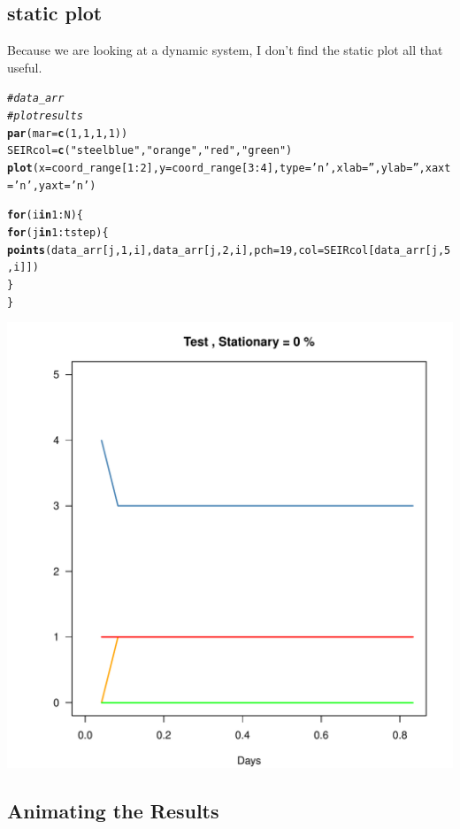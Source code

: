 \documentclass{article}\usepackage[]{graphicx}\usepackage[]{color}
\makeatletter
\def\maxwidth{ %
  \ifdim\Gin@nat@width>\linewidth
    \linewidth
  \else
    \Gin@nat@width
  \fi
}
\newcommand{\hlnum}[1]{\textcolor[rgb]{0.686,0.059,0.569}{#1}}%
\newcommand{\hlstr}[1]{\textcolor[rgb]{0.192,0.494,0.8}{#1}}%
\newcommand{\hlcom}[1]{\textcolor[rgb]{0.678,0.584,0.686}{\textit{#1}}}%
\newcommand{\hlopt}[1]{\textcolor[rgb]{0,0,0}{#1}}%
\newcommand{\hlstd}[1]{\textcolor[rgb]{0.345,0.345,0.345}{#1}}%
\newcommand{\hlkwa}[1]{\textcolor[rgb]{0.161,0.373,0.58}{\textbf{#1}}}%
\newcommand{\hlkwb}[1]{\textcolor[rgb]{0.69,0.353,0.396}{#1}}%
\newcommand{\hlkwc}[1]{\textcolor[rgb]{0.333,0.667,0.333}{#1}}%
\newcommand{\hlkwd}[1]{\textcolor[rgb]{0.737,0.353,0.396}{\textbf{#1}}}%
\newenvironment{kframe}{%
 \def\at@end@of@kframe{}%
 \ifinner\ifhmode%
  \def\at@end@of@kframe{\end{minipage}}%
  \begin{minipage}{\columnwidth}%
 \fi\fi%
 \def\FrameCommand##1{\hskip\@totalleftmargin \hskip-\fboxsep
 \colorbox{shadecolor}{##1}\hskip-\fboxsep
     \hskip-\linewidth \hskip-\@totalleftmargin \hskip\columnwidth}%
 \MakeFramed {\advance\hsize-\width
   \@totalleftmargin\z@ \linewidth\hsize
   \@setminipage}}%
 {\par\unskip\endMakeFramed%
 \at@end@of@kframe}
\newenvironment{knitrout}{}{} %
\makeatother
\begin{document}
\subsection{static plot}

Because we are looking at a dynamic system, I don't find the static plot all that useful. 
\begin{knitrout}
\color{fgcolor}\begin{kframe}
\begin{alltt}
\hlcom{# data_arr}
\hlcom{# plot results}
\hlkwd{par}\hlstd{(}\hlkwc{mar}\hlstd{=}\hlkwd{c}\hlstd{(}\hlnum{1}\hlstd{,}\hlnum{1}\hlstd{,}\hlnum{1}\hlstd{,}\hlnum{1}\hlstd{))}
\hlstd{SEIRcol} \hlkwb{=} \hlkwd{c}\hlstd{(}\hlstr{"steelblue"}\hlstd{,} \hlstr{"orange"}\hlstd{,}\hlstr{"red"}\hlstd{,} \hlstr{"green"}\hlstd{)}
\hlkwd{plot}\hlstd{(}\hlkwc{x}\hlstd{=coord_range[}\hlnum{1}\hlopt{:}\hlnum{2}\hlstd{],} \hlkwc{y}\hlstd{=coord_range[}\hlnum{3}\hlopt{:}\hlnum{4}\hlstd{],} \hlkwc{type}\hlstd{=}\hlstr{'n'}\hlstd{,} \hlkwc{xlab}\hlstd{=}\hlstr{''}\hlstd{,} \hlkwc{ylab}\hlstd{=}\hlstr{''}\hlstd{,} \hlkwc{xaxt}\hlstd{=}\hlstr{'n'}\hlstd{,} \hlkwc{yaxt}\hlstd{=}\hlstr{'n'}\hlstd{)}

\hlkwa{for}\hlstd{(i} \hlkwa{in} \hlnum{1}\hlopt{:}\hlstd{N)\{}
  \hlkwa{for}\hlstd{(j} \hlkwa{in} \hlnum{1}\hlopt{:}\hlstd{tstep)\{}
\hlkwd{points}\hlstd{(data_arr[j,}\hlnum{1}\hlstd{,i], data_arr[j,}\hlnum{2}\hlstd{,i],} \hlkwc{pch}\hlstd{=}\hlnum{19}\hlstd{,} \hlkwc{col}\hlstd{=SEIRcol[data_arr[j,}\hlnum{5}\hlstd{,i]])}
  \hlstd{\}}
\hlstd{\}}
\end{alltt}
\end{kframe}
\includegraphics[width=\maxwidth]{figure/unnamed-chunk-3-1} 

\end{knitrout}

\subsection{Animating the Results}
\end{document}
